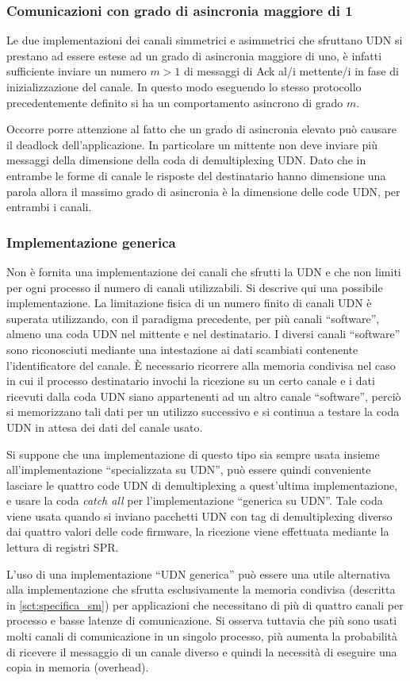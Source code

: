 \FloatBarrier
\subsubsection{Comunicazioni con grado di asincronia maggiore di 1}
\label{sct:ad_gt_1_udn}
Le due implementazioni dei canali simmetrici e asimmetrici che sfruttano UDN si prestano ad essere estese ad un grado di asincronia maggiore di uno, \`e infatti sufficiente inviare un numero $m > 1$ di messaggi di Ack al/i mettente/i in fase di inizializzazione del canale. In questo modo eseguendo lo stesso protocollo precedentemente definito si ha un comportamento asincrono di grado $m$. 

Occorre porre attenzione al fatto che un grado di asincronia elevato pu\`o causare il deadlock dell'applicazione. In particolare un mittente non deve inviare pi\`u messaggi della dimensione della coda di demultiplexing UDN. Dato che in entrambe le forme di canale le risposte del destinatario hanno dimensione una parola allora il massimo grado di asincronia \`e la dimensione delle code UDN, per entrambi i canali.

\FloatBarrier
\subsubsection{Implementazione generica}
\label{sct:generic_udn}
Non \`e fornita una implementazione dei canali che sfrutti la UDN e che non limiti per ogni processo il numero di canali utilizzabili. Si descrive qui una possibile implementazione. La limitazione fisica di un numero finito di canali UDN \`e superata utilizzando, con il paradigma precedente, per pi\`u canali ``software'', almeno una coda UDN nel mittente e nel destinatario. I diversi canali ``software'' sono riconosciuti mediante una intestazione ai dati scambiati contenente l'identificatore del canale. \`E necessario ricorrere alla memoria condivisa nel caso in cui il processo destinatario invochi la ricezione su un certo canale e i dati ricevuti dalla coda UDN siano appartenenti ad un altro canale ``software'', perci\`o si memorizzano tali dati per un utilizzo successivo e si continua a testare la coda UDN in attesa dei dati del canale usato. 

Si suppone che una implementazione di questo tipo sia sempre usata insieme all'implementazione ``specializzata su UDN'', pu\`o essere quindi conveniente lasciare le quattro code UDN di demultiplexing a quest'ultima implementazione, e usare la coda \emph{catch all} per l'implementazione ``generica su UDN''. Tale coda viene usata quando si inviano pacchetti UDN con tag di demultiplexing diverso dai quattro valori delle code firmware, la ricezione viene effettuata mediante la lettura di registri SPR. 

L'uso di una implementazione ``UDN generica'' pu\`o essere una utile alternativa alla implementazione che sfrutta esclusivamente la memoria condivisa (descritta in \ref{sct:specifica_sm}) per applicazioni che necessitano di pi\`u di quattro canali per processo e basse latenze di comunicazione. Si osserva tuttavia che pi\`u sono usati molti canali di comunicazione in un singolo processo, pi\`u aumenta la probabilit\`a di ricevere il messaggio di un canale diverso e quindi la necessit\`a di eseguire una copia in memoria (overhead).
